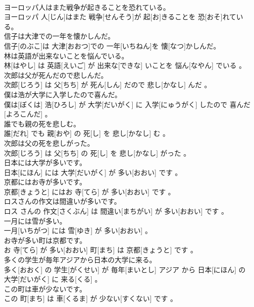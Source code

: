 \documentclass[8pt]{extreport}
\begin{document}
\begin{CJK}{UTF8}{min}
\\	ヨーロッパ人はまた戦争が起きることを恐れている。	
\\	ヨーロッパ 人[じん]はまた 戦争[せんそう]が 起[お]きることを 恐[おそ]れている。
\\	信子は大津での一年を懐かしんだ。	
\\	信子[のぶこ]は 大津[おおつ]での 一年[いちねん]を 懐[なつ]かしんだ。
\\	林は英語が出来ないことを悩んでいる。	
\\	林[はやし] は 英語[えいご] が 出来な[できな] いことを 悩ん[なやん] でいる 。
\\	次郎は父が死んだので悲しんだ。	
\\	次郎[じろう] は 父[ちち] が 死ん[しん] だので 悲し[かなし] んだ 。
\\	僕は浩が大学に入学したので喜んだ。	
\\	僕は[ぼくは] 浩[ひろし] が 大学[だいがく] に 入学[にゅうがく] したので 喜んだ[よろこんだ] 。
\\	誰でも親の死を悲しむ。	
\\	誰[だれ] でも 親[おや] の 死[し] を 悲し[かなし] む 。
\\	次郎は父の死を悲しがった。	
\\	次郎[じろう] は 父[ちち] の 死[し] を 悲し[かなし] がった 。
\\	日本には大学が多いです。	
\\	日本[にほん] には 大学[だいがく] が 多い[おおい] です 。
\\	京都にはお寺が多いです。	
\\	京都[きょうと] にはお 寺[てら] が 多い[おおい] です 。
\\	ロスさんの作文は間違いが多いです。	
\\	ロス さんの 作文[さくぶん] は 間違い[まちがい] が 多い[おおい] です 。
\\	一月には雪が多い。	
\\	一月[いちがつ] には 雪[ゆき] が 多い[おおい] 。
\\	お寺が多い町は京都です。	
\\	お 寺[てら] が 多い[おおい] 町[まち] は 京都[きょうと] です 。
\\	多くの学生が毎年アジアから日本の大学に来る。	
\\	多く[おおく] の 学生[がくせい] が 毎年[まいとし] アジア から 日本[にほん] の 大学[だいがく] に 来る[くる] 。
\\	この町は車が少ないです。	
\\	この 町[まち] は 車[くるま] が 少ない[すくない] です 。

\end{CJK}
\end{document}
